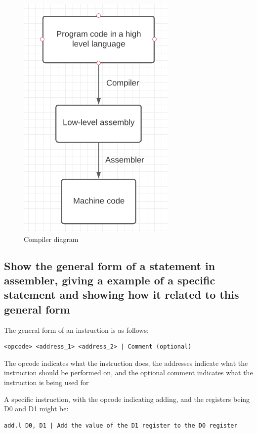 \documentclass{article}
\begin{document}
\begin{figure}
\centering
\includegraphics{compilerDiagram.png}
\caption{Compiler diagram}
\end{figure}



\subsection{Show the general form of a statement in assembler, giving a
example of a specific statement and showing how it related to this
general form}

The general form of an instruction is as follows:

\begin{verbatim}
<opcode> <address_1> <address_2> | Comment (optional) 
\end{verbatim}

The opcode indicates what the instruction does, the addresses indicate
what the instruction should be performed on, and the optional comment
indicates what the instruction is being used for

A specific instruction, with the opcode indicating adding, and the
registers being D0 and D1 might be:

\begin{verbatim}
add.l D0, D1 | Add the value of the D1 register to the D0 register
\end{verbatim}
\end{document}
